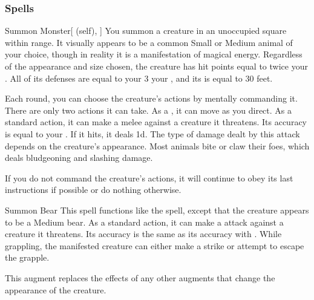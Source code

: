 \subsubsection{Spells}


\lowercase{\hypertarget{spell:Summon Monster}{}}\label{spell:Summon Monster}
\begin{ability}[\nth{1}]{\hypertarget{spell:Summon Monster}{Summon Monster}}[ (self), ]
You summon a creature in an unoccupied square within \rngmed range.
It visually appears to be a common Small or Medium animal of your choice, though in reality it is a manifestation of magical energy.
Regardless of the appearance and size chosen, the creature has hit points equal to twice your .
All of its defenses are equal to your 3 \add your , and its  is equal to 30 feet.

Each round, you can choose the creature's actions by mentally commanding it.
There are only two actions it can take.
As a , it can move as you direct.
As a standard action, it can make a melee  against a creature it threatens.
Its accuracy is equal to your .
If it hits, it deals  \minus1d.
The type of damage dealt by this attack depends on the creature's appearance.
Most animals bite or claw their foes, which deals bludgeoning and slashing damage.

If you do not command the creature's actions, it will continue to obey its last instructions if possible or do nothing otherwise.
\end{ability}
\vspace{0.25em}



\lowercase{\hypertarget{spell:Summon Bear}{}}\label{spell:Summon Bear}
\begin{ability}[\nth{2}]{\hypertarget{spell:Summon Bear}{Summon Bear}}
This spell functions like the  spell, except that the creature appears to be a Medium bear.
As a standard action, it can make a  attack against a creature it threatens.
Its accuracy is the same as its accuracy with .
While grappling, the manifested creature can either make a strike or attempt to escape the grapple.

This augment replaces the effects of any other augments that change the appearance of the creature.
\end{ability}
\vspace{0.25em}



